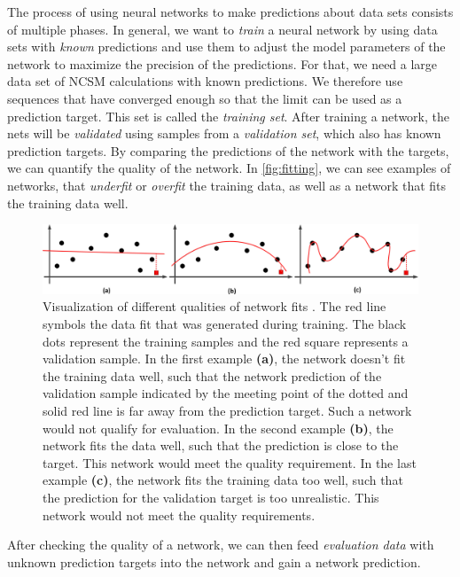 The process of using neural networks to make predictions about data sets consists of multiple phases.
In general, we want to \textit{train} a neural network by using data sets with \textit{known} predictions and use them to adjust the model parameters of the network to maximize the precision of the predictions. For that, we need a large data set of NCSM calculations with known predictions. We therefore use sequences that have converged enough so that the limit can be used as a prediction target. This set is called the \textit{training set}.
After training a network, the nets will be \textit{validated} using samples from a \textit{validation set}, which also has known prediction targets. By comparing the predictions of the network with the targets, we can quantify the quality of the network. In \autoref{fig:fitting}, we can see examples of networks, that \textit{underfit} or \textit{overfit} the training data, as well as a network that fits the training data well.

\begin{figure}[H]
  \includegraphics[width=\linewidth]{media/networkquality.png}
  \caption{Visualization of different qualities of network fits \cite{underfit}. The red line symbols the data fit that was generated during training. The black dots represent the training samples and the red square represents a validation sample. In the first example \textbf{(a)}, the network doesn't fit the training data well, such that the network prediction of the validation sample indicated by the meeting point of the dotted and solid red line is far away from the prediction target. Such a network would not qualify for evaluation. In the second example \textbf{(b)}, the network fits the data well, such that the prediction is close to the target. This network would meet the quality requirement. In the last example \textbf{(c)}, the network fits the training data too well, such that the prediction for the validation target is too unrealistic. This network would not meet the quality requirements.}
  \label{fig:fitting}
\end{figure}

After checking the quality of a network, we can then feed \textit{evaluation data} with unknown prediction targets into the network and gain a network prediction.

